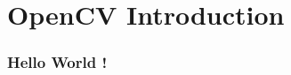 \section{OpenCV Introduction}






\begin{frame}
\frametitle{Hello World !}

\begin{center}

\end{center}

\end{frame}

